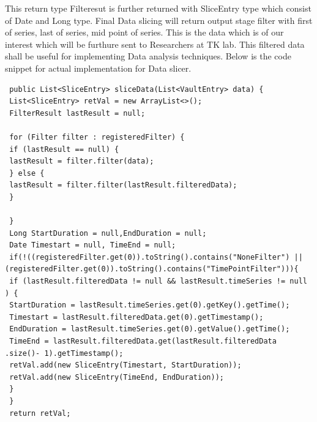 \documentclass[article,type=msc,colorback,accentcolor=tud9c,twoside,11pt]{tudthesis}
\begin{document}
 This return type Filteresut is further returned with SliceEntry type which consist of Date and Long type. Final Data slicing will return output stage filter with first of series, last of series, mid point of series. This is the data which is of our interest which will be furthure sent to Researchers at TK lab. This filtered data shall be useful for implementing Data analysis techniques\cite{DatananlysisandTechniques}. Below is the code snippet for actual implementation for Data slicer.
 \begin{lstlisting}
 public List<SliceEntry> sliceData(List<VaultEntry> data) {
 List<SliceEntry> retVal = new ArrayList<>();
 FilterResult lastResult = null;
 
 for (Filter filter : registeredFilter) {
 if (lastResult == null) {
 lastResult = filter.filter(data);
 } else {
 lastResult = filter.filter(lastResult.filteredData);
 }
 
 }
 Long StartDuration = null,EndDuration = null;
 Date Timestart = null, TimeEnd = null; 
 if(!((registeredFilter.get(0)).toString().contains("NoneFilter") || (registeredFilter.get(0)).toString().contains("TimePointFilter"))){
 if (lastResult.filteredData != null && lastResult.timeSeries != null ) {
 StartDuration = lastResult.timeSeries.get(0).getKey().getTime();
 Timestart = lastResult.filteredData.get(0).getTimestamp();
 EndDuration = lastResult.timeSeries.get(0).getValue().getTime();
 TimeEnd = lastResult.filteredData.get(lastResult.filteredData .size()- 1).getTimestamp();
 retVal.add(new SliceEntry(Timestart, StartDuration));
 retVal.add(new SliceEntry(TimeEnd, EndDuration)); 
 }
 } 
 return retVal;
 \end{lstlisting}
 \clearpage
 
 
\end{document}
